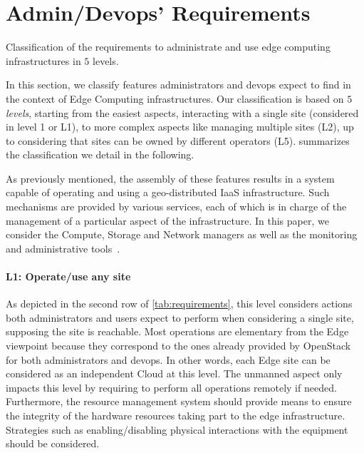 
\section{Admin/Devops' Requirements}
\label{sec:requirements}

%   

\begin{table*}
    \centering
        
    \caption{Classification of the requirements to administrate and use edge
    computing infrastructures in $5$ levels.}
    \label{tab:requirements}
\end{table*}

In this section, we classify features administrators and devops expect
to find in the context of Edge Computing infrastructures.
Our classification is based on $5$ \emph{levels}, starting from the easiest
aspects, \ie interacting with a single site (considered in level 1 or L1), to
more complex aspects like managing multiple sites (L2), up to considering that
sites can be owned by different operators (L5).
 summarizes the classification we detail in the following. 

As previously mentioned, the assembly of these features results in a
system capable of operating and using a geo-distributed IaaS
infrastructure.  Such mechanisms are provided by various services,
each of which is in charge of the management of a particular aspect of
the infrastructure. In this paper, we consider the Compute, Storage
and Network managers as well as the monitoring and administrative
tools~\cite{moreno2012csp}.

\paragraph{L1: Operate/use any site}
As depicted in the second row of \cref{tab:requirements}, this level
considers actions both administrators and users expect to perform
when considering a single site, supposing the site is reachable.
%
Most operations are elementary from the Edge viewpoint because they
correspond to the ones already provided by OpenStack for both administrators and devops.  In other words,
each Edge site can be considered as an independent Cloud at this
level. The unmanned aspect only impacts this level by requiring to perform all operations
remotely if needed.
Furthermore, the resource management system should provide means to
ensure the integrity of the hardware resources taking part to the edge
infrastructure. Strategies such as enabling/disabling physical
interactions with the equipment should be considered.

